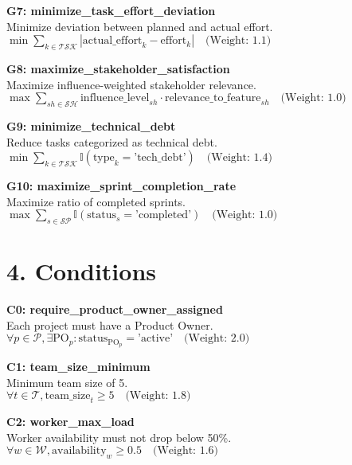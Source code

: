 \documentclass[12pt]{article}
\begin{document}
    \item \textbf{G7: minimize\_task\_effort\_deviation} \\
    Minimize deviation between planned and actual effort. \\
    $\min \sum_{k \in \mathcal{TSK}} |\text{actual\_effort}_k - \text{effort}_k| \quad \text{(Weight: 1.1)}$

    \item \textbf{G8: maximize\_stakeholder\_satisfaction} \\
    Maximize influence-weighted stakeholder relevance. \\
    $\max \sum_{sh \in \mathcal{SH}} \text{influence\_level}_{sh} \cdot \text{relevance\_to\_feature}_{sh} \quad \text{(Weight: 1.0)}$

    \item \textbf{G9: minimize\_technical\_debt} \\
    Reduce tasks categorized as technical debt. \\
    $\min \sum_{k \in \mathcal{TSK}} \mathbb{I}(\text{type}_k = \text{'tech\_debt'}) \quad \text{(Weight: 1.4)}$

    \item \textbf{G10: maximize\_sprint\_completion\_rate} \\
    Maximize ratio of completed sprints. \\
    $\max \sum_{s \in \mathcal{SP}} \mathbb{I}(\text{status}_s = \text{'completed'}) \quad \text{(Weight: 1.0)}$

\section{4. Conditions}
\item \textbf{C0: require\_product\_owner\_assigned} \\
    Each project must have a Product Owner. \\
    $\forall p \in \mathcal{P}, \exists \text{PO}_p : \text{status}_{\text{PO}_p} = \text{'active'} \quad \text{(Weight: 2.0)}$

    \item \textbf{C1: team\_size\_minimum} \\
    Minimum team size of 5. \\
    $\forall t \in \mathcal{T}, \text{team\_size}_t \geq 5 \quad \text{(Weight: 1.8)}$

    \item \textbf{C2: worker\_max\_load} \\
    Worker availability must not drop below 50\%. \\
    $\forall w \in \mathcal{W}, \text{availability}_w \geq 0.5 \quad \text{(Weight: 1.6)}$
\end{document}
